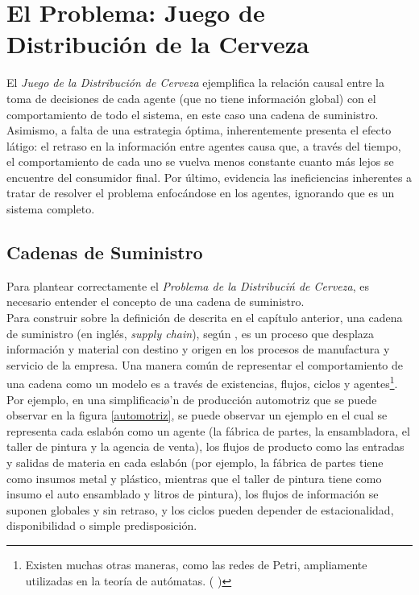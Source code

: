 \chapter{El Problema: Juego de Distribuci\'on de la Cerveza}

El \textit{Juego de la Distribución de Cerveza} ejemplifica la relaci\'on causal entre la toma de decisiones de cada agente (que no tiene informaci\'on global) con el comportamiento de todo el sistema, en este caso una cadena de suministro. Asimismo, a falta de una estrategia \'optima, inherentemente presenta el efecto l\'atigo: el retraso en la informaci\'on entre agentes causa que, a trav\'es del tiempo, el comportamiento de cada uno se vuelva menos constante cuanto m\'as lejos se encuentre del consumidor final. Por \'ultimo, evidencia las ineficiencias inherentes a tratar de resolver el problema enfoc\'andose en los agentes, ignorando que es un sistema completo. 




\section{Cadenas de Suministro}

Para plantear correctamente el \textit{Problema de la Distribuci\'n de Cerveza}, es necesario entender el concepto de una cadena de suministro. \\

Para construir sobre la definici\'on de \citet{Sterman} descrita en el cap\'itulo anterior, una cadena de suministro (en ingl\'es, \textit{supply chain}), seg\'un \citet{Jacobs}, es un proceso que desplaza informaci\'on y material con destino y origen en los procesos de manufactura y servicio de la empresa. Una manera com\'un de representar el comportamiento de una cadena como un modelo es a trav\'es de existencias, flujos, ciclos y agentes\footnote{Existen muchas otras maneras, como las redes de Petri, ampliamente utilizadas en la teor\'ia de aut\'omatas. ( \citet{Shiflet})}. Por ejemplo, en una simplificaci\o'n de producci\'on automotriz que se puede observar en la figura \ref{automotriz}, se puede observar un ejemplo en el cual se representa cada eslab\'on como un agente (la f\'abrica de partes, la ensambladora, el taller de pintura y la agencia de venta), los flujos de producto como las entradas y salidas de materia en cada eslab\'on (por ejemplo, la f\'abrica de partes tiene como insumos metal y pl\'astico, mientras que el taller de pintura tiene como insumo el auto ensamblado y litros de pintura), los flujos de informaci\'on se suponen globales y sin retraso, y los ciclos pueden depender de estacionalidad, disponibilidad o simple predisposici\'on.\\

